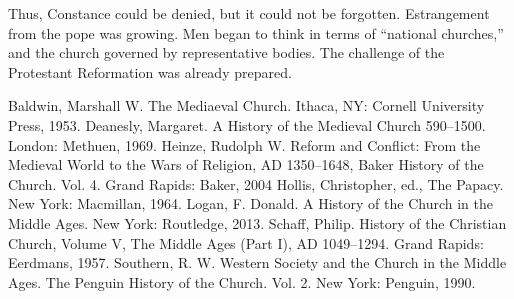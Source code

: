 Thus, Constance could be denied, but it could not be forgotten. Estrangement from the pope was
growing. Men began to think in terms of “national churches,” and the church governed by
representative bodies. The challenge of the Protestant Reformation was already prepared.

\begin{readinglist}
\entry Baldwin, Marshall W. The Mediaeval Church. Ithaca, NY: Cornell University Press, 1953.
\entry Deanesly, Margaret. A History of the Medieval Church 590–1500. London: Methuen, 1969.
\entry Heinze, Rudolph W. Reform and Conflict: From the Medieval World to the Wars of Religion, AD
  1350–1648, Baker History of the Church. Vol. 4. Grand Rapids: Baker, 2004
\entry Hollis, Christopher, ed., The Papacy. New York: Macmillan, 1964.
\entry *Logan, F. Donald. A History of the Church in the Middle Ages. New York: Routledge, 2013.
\entry Schaff, Philip. History of the Christian Church, Volume V, The Middle Ages (Part I), AD
  1049–1294. Grand Rapids: Eerdmans, 1957.
\entry *Southern, R. W. Western Society and the Church in the Middle Ages. The Penguin History of
  the Church. Vol. 2. New York: Penguin, 1990.
\end{readinglist}
